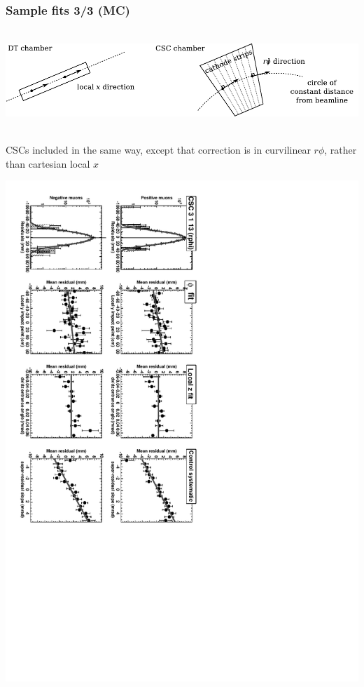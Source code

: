 \documentclass[compress]{beamer}
\begin{document}
\begin{frame}
\frametitle{Sample fits 3/3 (MC)}

\mbox{ } \hfill \includegraphics[width=0.8\linewidth]{strip_direction.pdf} \hfill \mbox{ }

\vfill
CSCs included in the same way, except that correction is in
curvilinear $r\phi$, rather than cartesian local $x$

\vfill
\includegraphics[height=\linewidth, angle=90]{exampleCSC_rphi.pdf}
\end{frame}
\end{document}

